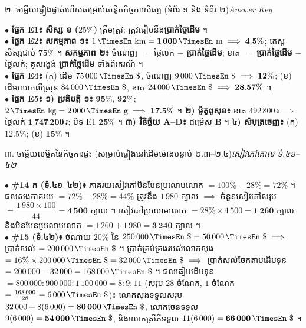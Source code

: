 \documentclass[a4paper,10pt]{article}
\newcommand{\en}[1]{{\TimesEn #1}}
\newcommand{\unit}[1]{\,\text{\en{#1}}}
\newcommand{\riel}{\,\text{៛}}
\newcommand{\usd}{\,\text{\en{\$}}}
\newcommand{\secstrip}[2]{%
  \vspace{3pt}%
  \begin{tcolorbox}[
    enhanced, sharp corners, colback=panelgray, colframe=black,
    boxrule=0.8pt, boxsep=0.8pt, top=2pt, bottom=2pt, left=5pt, right=5pt,
    after skip=3pt
  ]
    {\muol\fontsize{8.5pt}{12.2pt}\selectfont #1}\hfill{\fontsize{7.8pt}{10.8pt}\selectfont\textit{#2}}
  \end{tcolorbox}%
}
\begin{document}
\secstrip{២. ចម្លើយផ្ទៀងផ្ទាត់រហ័សសម្រាប់សន្លឹកកិច្ចការសិស្ស (ទំព័រ ១ និង ទំព័រ ២)}{\en{Answer Key}}

\begin{tcolorbox}[
  enhanced, sharp corners, colback=white, colframe=black,
  boxrule=0.8pt, boxsep=1.5pt, top=3pt, bottom=3pt, left=5pt, right=5pt,
  after skip=3.5pt
]
  \fontsize{8.8pt}{13.2pt}\selectfont
  $\bullet$ \textbf{ផ្នែក \en{E1}៖} \textbf{សិស្ស ខ ($25\%$)} ត្រឹមត្រូវ; ត្រូវធៀបនឹង\textbf{ប្រាក់ថ្លៃដើម} ។\\[2pt]
  $\bullet$ \textbf{ផ្នែក \en{E2}៖} \textbf{សកម្មភាព ១៖} $1\unit{km} = \mathbf{1\,000}\unit{m} \implies \mathbf{4.5\%}$; តេស្តសិស្សជាប់ $\mathbf{75\%}$ ។ \textbf{សកម្មភាព ២៖} ចំណេញ $=$ ថ្លៃលក់ $-$ \textbf{ប្រាក់ថ្លៃដើម}; ខាត $=$ \textbf{ប្រាក់ថ្លៃដើម} $-$ ថ្លៃលក់; គូសរង្វង់ \textbf{ប្រាក់ថ្លៃដើម} ទាំងពីរករណី ។\\[2pt]
  $\bullet$ \textbf{ផ្នែក \en{E4}៖} (ក) ដើម $75\,000\usd$, ចំណេញ $9\,000\usd \implies \mathbf{12\%}$; (ខ) ដើមលោកលីស្រ៊ុន $84\,000\usd$, ខាត $24\,000\usd \implies \mathbf{28.57\%}$ ។\\[2pt]
  $\bullet$ \textbf{ផ្នែក \en{E5}៖} \textbf{១) ប្រតិបត្តិ ១៖} $\mathbf{95\%}$, $\mathbf{92\%}$; $2\unit{kg}=2\,000\unit{g} \implies \mathbf{17.5\%}$ ។ \textbf{២) ម៉ូតូពូសុខ៖} ខាត $492\,800\riel \implies$ ថ្លៃលក់ $\mathbf{1\,747\,200\riel}$; បិទ \en{E1} $\mathbf{25\%}$ ។ \textbf{៣) វិនិច្ឆ័យ \en{A--D}៖} ជម្រើស \textbf{\en{B}} ។ \textbf{៤) សំបុត្រចេញ៖} (ក) $\mathbf{12.5\%}$; (ខ) $\mathbf{15\%}$ ។
\end{tcolorbox}

\secstrip{៣. ចម្លើយលម្អិតនៃកិច្ចការផ្ទះ (សម្រាប់ផ្ទៀងនៅដើមម៉ោងបន្ទាប់ ២.៣--២.៤)}{សៀវភៅគោល ទំ.៤១--៤២}

\begin{tcolorbox}[
  enhanced, sharp corners, colback=white, colframe=black,
  boxrule=0.8pt, boxsep=1.5pt, top=3pt, bottom=3pt, left=5pt, right=5pt
]
  \fontsize{8.6pt}{12.8pt}\selectfont
  $\bullet$ \textbf{\#14 ក (ទំ.៤១--៤២)៖} ភាគរយសៀវភៅមិនមែនប្រលោមលោក $= 100\% - 28\% = 72\%$ ។ ផលសងភាគរយ $= 72\% - 28\% = 44\%$ ត្រូវនឹង $1\,980$ ក្បាល $\implies$ ចំនួនសៀវភៅសរុប $= \dfrac{1\,980 \times 100}{44} = \mathbf{4\,500\text{ ក្បាល}}$ ។ សៀវភៅប្រលោមលោក $= 28\% \times 4\,500 = \mathbf{1\,260\text{ ក្បាល}}$ និងមិនមែនប្រលោមលោក $= 1\,260 + 1\,980 = \mathbf{3\,240\text{ ក្បាល}}$ ។\\[3pt]
  $\bullet$ \textbf{\#15 (ទំ.៤២)៖} ចំណាយ $20\%$ នៃ $250\,000\usd = 50\,000\usd \implies$ ប្រាក់សល់ $= 200\,000\usd$ ។ ប្រាក់គ្រប់គ្រងរបស់លោកសុង $= 16\% \times 200\,000\usd = 32\,000\usd \implies$ ប្រាក់សល់ចែកតាមដើមទុន $= 200\,000 - 32\,000 = 168\,000\usd$ ។ ផលធៀបដើមទុន $= 800\,000 : 900\,000 : 1\,100\,000 = 8 : 9 : 11$ (សរុប $28$ ចំណែក, $1$ ចំណែក $= \frac{168\,000}{28} = 6\,000\usd$)៖ លោកសុងទទួលសរុប $32\,000 + 8(6\,000) = \mathbf{80\,000\usd}$, លោកចេនទទួល $9(6\,000) = \mathbf{54\,000\usd}$, និងលោកស្រីភីទទួល $11(6\,000) = \mathbf{66\,000\usd}$ ។
\end{tcolorbox}
\end{document}
